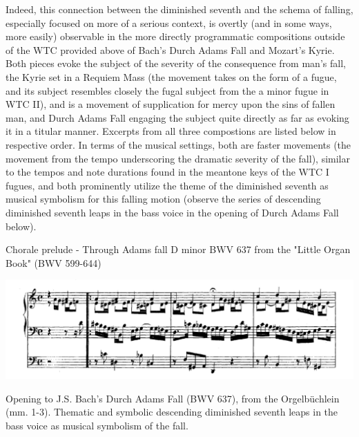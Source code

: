 Indeed, this connection between the diminished seventh and the schema of
falling, especially focused on more of a serious context, is overtly
(and in some ways, more easily) observable in the more directly
programmatic compositions outside of the WTC provided above of Bach's
Durch Adams Fall and Mozart's Kyrie. Both pieces evoke the subject of
the severity of the consequence from man's fall, the Kyrie set in a
Requiem Mass (the movement takes on the form of a fugue, and its subject
resembles closely the fugal subject from the a minor fugue in WTC II),
and is a movement of supplication for mercy upon the sins of fallen man,
and Durch Adams Fall engaging the subject quite directly as far as
evoking it in a titular manner. Excerpts from all three compostions are
listed below in respective order. In terms of the musical settings, both
are faster movements (the movement from the tempo underscoring the
dramatic severity of the fall), similar to the tempos and note durations
found in the meantone keys of the WTC I fugues, and both prominently
utilize the theme of the diminished seventh as musical symbolism for
this falling motion (observe the series of descending diminished seventh
leaps in the bass voice in the opening of Durch Adams Fall below).

    Chorale prelude - Through Adams fall D minor BWV 637 from the "Little
Organ Book" (BWV 599-644)
\begin{Example}[H]
\centering
\includegraphics{durch_adams_fall_nt.png}
\caption[Opening to J.S. Bach's Durch Adams Fall (BWV 637), from the Orgelbüchlein.]{Opening to J.S. Bach's Durch Adams Fall (BWV 637), from the Orgelbüchlein (mm. 1-3). Thematic and symbolic descending diminished seventh leaps in the bass voice as musical symbolism of the fall.}
\end{Example}

